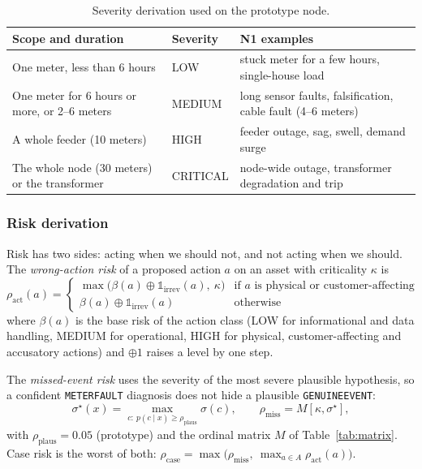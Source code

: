 \documentclass[11pt,a4paper]{article}
\renewcommand{\_}{\textunderscore\allowbreak}
\providecommand{\GE}{\texttt{GENUINE\_EVENT}}
\providecommand{\MF}{\texttt{METER\_FAULT}}
\begin{document}
\begin{table}[H]
\centering\small
\begin{tabularx}{\textwidth}{@{}>{\raggedright\arraybackslash}p{6.3cm}>{\raggedright\arraybackslash}p{2.0cm}L@{}}
\toprule
\textbf{Scope and duration} & \textbf{Severity} & \textbf{N1 examples} \\
\midrule
One meter, less than 6 hours & LOW & stuck meter for a few hours, single-house load \\
One meter for 6 hours or more, or 2--6 meters & MEDIUM & long sensor faults, falsification, cable fault (4--6 meters) \\
A whole feeder (10 meters) & HIGH & feeder outage, sag, swell, demand surge \\
The whole node (30 meters) or the transformer & CRITICAL & node-wide outage, transformer degradation and trip \\
\bottomrule
\end{tabularx}
\caption{Severity derivation used on the prototype node.}
\label{tab:severity}
\end{table}

\subsubsection{Risk derivation}
Risk has two sides: acting when we should not, and not acting when we should. The \emph{wrong-action risk} of a
proposed action $a$ on an asset with criticality $\kappa$ is
\begin{equation}
\rho_{\mathrm{act}}(a)=\begin{cases}\max\bigl(\beta(a)\oplus\mathbb 1_{\mathrm{irrev}}(a),\ \kappa\bigr) & \text{if $a$ is physical or customer-affecting}\\
\beta(a)\oplus\mathbb 1_{\mathrm{irrev}}(a) & \text{otherwise}\end{cases}
\end{equation}
where $\beta(a)$ is the base risk of the action class (LOW for informational and data handling, MEDIUM for
operational, HIGH for physical, customer-affecting and accusatory actions) and $\oplus 1$ raises a level by one
step.

The \emph{missed-event risk} uses the severity of the most severe plausible hypothesis, so a confident \MF{}
diagnosis does not hide a plausible \GE:
\begin{equation}
\sigma^\star(x)=\max_{c:\ p(c\mid x)\ge\rho_{\mathrm{plaus}}}\sigma(c),\qquad \rho_{\mathrm{miss}}=M[\kappa,\sigma^\star],
\end{equation}
with $\rho_{\mathrm{plaus}}=0.05$ (prototype) and the ordinal matrix $M$ of Table~\ref{tab:matrix}. Case risk is
the worst of both: $\rho_{\mathrm{case}}=\max\bigl(\rho_{\mathrm{miss}},\ \max_{a\in A}\rho_{\mathrm{act}}(a)\bigr)$.
\end{document}
